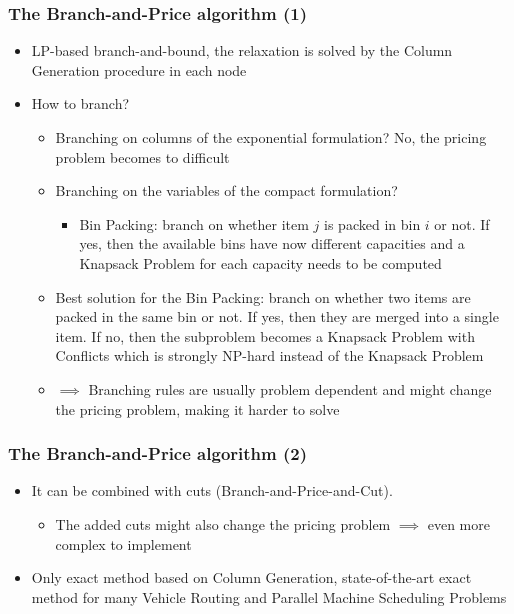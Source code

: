 \documentclass[10pt]{beamer}
\begin{document}
\begin{frame}
  \frametitle{The Branch-and-Price algorithm (1)}
  
  \begin{itemize}
    \item LP-based branch-and-bound, the relaxation is solved by the Column Generation procedure in each node
    \item How to branch?
      \begin{itemize}
        \item Branching on columns of the exponential formulation? No, the pricing problem becomes to difficult
          \item Branching on the variables of the compact formulation?
            \begin{itemize}
              \item Bin Packing: branch on whether item $j$ is packed in bin $i$ or not. If yes, then the available bins have now different capacities and a Knapsack Problem for each capacity needs to be computed
            \end{itemize}
          \item Best solution for the Bin Packing: branch on whether two items are packed in the same bin or not. If yes, then they are merged into a single item. If no, then the subproblem becomes a Knapsack Problem with Conflicts which is strongly NP-hard instead of the Knapsack Problem
          \item $\implies$ Branching rules are usually problem dependent and might change the pricing problem, making it harder to solve
      \end{itemize}
  \end{itemize}
\end{frame}

\begin{frame}
  \frametitle{The Branch-and-Price algorithm (2)}
  \begin{itemize}
      \item It can be combined with cuts (Branch-and-Price-and-Cut).
        \begin{itemize}
          \item The added cuts might also change the pricing problem $\implies$ even more complex to implement
        \end{itemize}
      \item Only exact method based on Column Generation, state-of-the-art exact method for many Vehicle Routing and Parallel Machine Scheduling Problems
  \end{itemize}
\end{frame}
\end{document}
